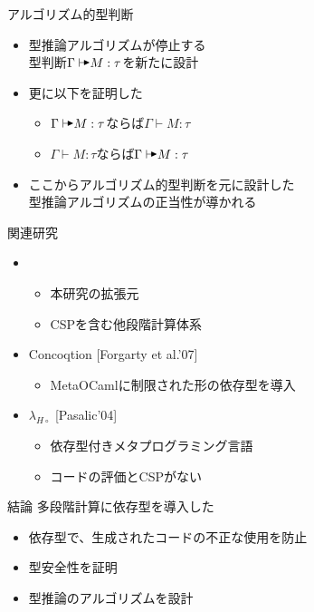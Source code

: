 \documentclass[dvipdfmx,aspectratio=169, 20pt]{beamer}
\begin{document}
\begin{frame}[fragile]{アルゴリズム的型判断}
    \begin{itemize}
    \item 型推論アルゴリズムが停止する\\
        型判断\( \Gamma \AV M : \tau \)を新たに設計
    \item 更に以下を証明した
    \begin{itemize}
            \item \( \Gamma \AV M : \tau \)ならば\( \Gamma \vdash M : \tau \)
            \item \( \Gamma \vdash M : \tau \)ならば\( \Gamma \AV M : \tau \)
    \end{itemize}

    \item ここからアルゴリズム的型判断を元に設計した\\型推論アルゴリズムの正当性が導かれる
    \end{itemize}
\end{frame}

\begin{frame}[fragile]{関連研究}
    \begin{itemize}
        \item {}
            \begin{itemize}
                    \item 本研究の拡張元
                    \item CSPを含む他段階計算体系
            \end{itemize}
        \item Concoqtion [Forgarty et al.'07]
            \begin{itemize}
                \item MetaOCamlに制限された形の依存型を導入
            \end{itemize}
        \item \( \lambda_{H\circ} \) [Pasalic'04]
            \begin{itemize}
                \item 依存型付きメタプログラミング言語
                \item コードの評価とCSPがない
            \end{itemize}
    \end{itemize}
\end{frame}

\begin{frame}[fragile]{結論}
    多段階計算に依存型を導入した
    \begin{itemize}
        \item 依存型で、生成されたコードの不正な使用を防止
        \item 型安全性を証明 
        \item 型推論のアルゴリズムを設計 
    \end{itemize}
\end{frame}
\end{document}

